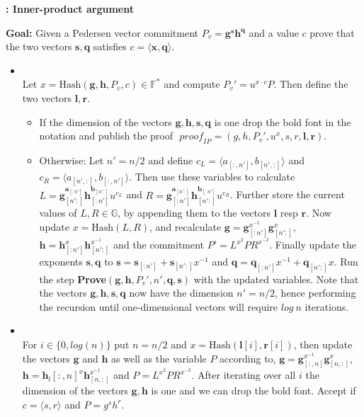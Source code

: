 \begin{algorithm}
\caption{\textbf{: Inner-product argument}}
\textbf{Goal:} Given a Pedersen vector  commitment $P_v=\bm{g}^{\bm{s}} \bm{h}^{\bm{q}}$ and a value $c$ prove that the two vectors $\bm{s},\bm{q}$ satisfies $c=\langle\bm{x},\bm{q}\rangle$.
\vspace{2pt}
\hline
\vspace{2pt}
\begin{itemize}
\item{}\\
Let $x=\text{Hash}(\mathbf{g},\mathbf{h},P_v,c) \in\mathds{F}^*$ and compute $P_v'= u^{x\cdot c}P$. Then define the two vectors $\mathbf{l},\mathbf{r}$.
\begin{itemize}
    \item If the dimension of the vectors $\mathbf{g},\mathbf{h},\mathbf{s},\mathbf{q}$ is one drop the bold font in the notation and publish the proof $\textit{ proof}_{IP}=(g,h,P_v',u^x,s,r,\mathbf{l},\mathbf{r})$.
    \item  Otherwise:  Let $n'=n/2$ and define  $c_L=\langle a_{[:,n']},b_{[n',:]} \rangle$ and $c_R=\langle a_{[n',:]},b_{[:,n']} \rangle$. Then use these variables to calculate $L=\mathbf{g}_{[n':]}^{\mathbf{a}_{[:n']}} \mathbf{h}_{[:n']}^{\mathbf{b}_{[n':]}} u^{c_L}$ and $R=\mathbf{g}_{[:n']}^{\mathbf{a}_{[n':]}} \mathbf{h}_{[n':]}^{\mathbf{b}_{[:n']}} u^{c_R}$. Further store the current values of $L,R\in\mathds{G}$, by appending them to the vectors $\mathbf{l}$ resp $\mathbf{r}$. Now update $x=\text{Hash}(L,R)$, and recalculate $\mathbf{g} = \mathbf{g}_{[:n']}^{x^{-1}}\mathbf{g}_{[n':]}^{x}$, $\mathbf{h} = \mathbf{h}_{[:n']}^{x}\mathbf{h}_{[n':]}^{x^{-1}}$ and the commitment $P'=L^{x^2}PR^{x^{-2}}$. Finally update the exponents $\mathbf{s},\mathbf{q}$ to $\mathbf{s} = \mathbf{s}_{[:n']}+\mathbf{s}_{[n':]}x^{-1}$ and $\mathbf{q} = \mathbf{q}_{[:n']}x^{-1}+\mathbf{q}_{[n':]}x$. Run the step \textbf{Prove}$(\mathbf{g},\mathbf{h},P_v',n',\mathbf{q},\mathbf{s})$ with the updated variables. Note that the vectors $\mathbf{g},\mathbf{h},\mathbf{s},\mathbf{q}$ now have the dimension $n'=n/2$, hence performing the recursion until one-dimensional vectors will require $log\:n$ iterations.
\end{itemize}
\item{}\\
For $i\in\{0,log(n)\}$ put $n=n/2$ and $x=\text{Hash}(\bm{l}[i],\bm{r}[i])$, then update the vectors $\bm{g}$ and $\bm{h}$ as well as the  variable $P$ according to, $\bm{g}= \bm{g}_{[:,n]}^{x^{-1}}\bm{g}_{[n,:]}^{x}$, $\bm{h}= \bm{h}_l{[:,n]}^{x}\bm{h}_{[n,:]}^{x^{-1}}$ and $ P = L^{x^2}PR^{x^{-2}}  $. After iterating over all $i$ the dimension of the vectors $\bm{g},\bm{h}$ is one and we can drop the bold font. Accept if $c=\langle s,r\rangle$ and $P =g^sh^r$.
\end{itemize}
\label{alg:inner_product}
\end{algorithm}

